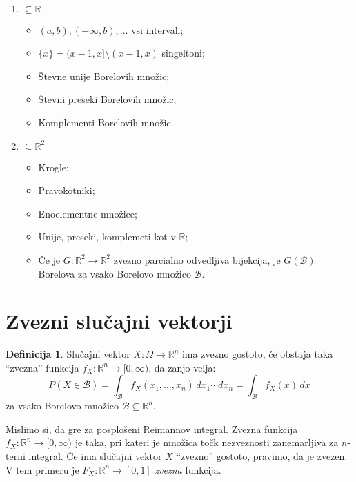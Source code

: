 \documentclass[12pt]{book}
\def\n{\noindent}
\theoremstyle{definition}
\newtheorem{definicija}{Definicija}
\theoremstyle{plain}
\theoremstyle{plain}
\theoremstyle{plain}
\theoremstyle{remark}
\begin{document}
\begin{zgled}
    ~

    \begin{enumerate}
        \item $\subseteq \mathbb{R}$
        \begin{itemize}
            \item $(a, b), (-\infty, b), \ldots$ vsi intervali;
            \item $\{x\}=(x-1,x]\setminus(x-1,x)$ singeltoni;
            \item Števne unije Borelovih množic;
            \item Števni preseki Borelovih množic;
            \item Komplementi Borelovih množic.
        \end{itemize}
        \item $\subseteq \mathbb{R}^2$
        \begin{itemize}
            \item Krogle;
            \item Pravokotniki;
            \item Enoelementne množice;
            \item Unije, preseki, komplemeti kot v $\mathbb{R}$;
            \item Če je $G: \mathbb{R}^2 \rightarrow \mathbb{R}^2$ zvezno parcialno odvedljiva bijekcija, je $G(\mathcal{B})$ Borelova za vsako Borelovo množico $\mathcal{B}$.
        \end{itemize}
    \end{enumerate}
\end{zgled}

\section{Zvezni slučajni vektorji}

\begin{definicija}
    Slučajni vektor $X: \Omega \to \mathbb{R}^n$ ima zvezno gostoto, če obstaja taka “zvezna” funkcija $f_{X}: \mathbb{R}^n \rightarrow[0, \infty)$, da zanjo velja: 
    $$
    P(X \in \mathcal{B})=\int_{\mathcal{B}} f_{X}\left(x_1, \ldots, x_n\right) \, d x_1 \cdots d x_n = \int_{\mathcal{B}}f_X(x) \, dx
    $$
    za vsako Borelovo množico $\mathcal{B} \subseteq \mathbb{R}^n$.
\end{definicija}

\n Mislimo si, da gre za posplošeni Reimannov integral. Zvezna funkcija $f_X: \mathbb{R}^n \to [0,\infty)$  je taka, pri kateri je množica točk nezveznosti zanemarljiva za $n$-terni integral. Če ima slučajni vektor $X$ “zvezno” gostoto, pravimo, da je zvezen. V tem primeru je $F_X: \mathbb{R}^n \to [0,1]$ \emph{zvezna} funkcija.
\end{document}
